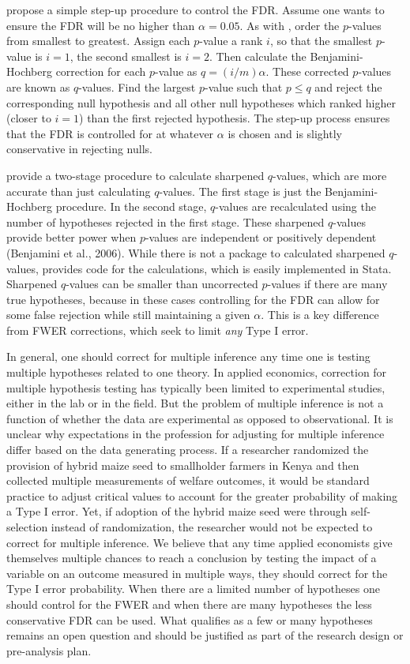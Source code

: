 \documentclass[11pt]{article}
\begin{document}
\cite{benjamini_controlling_1995} propose a simple step-up procedure to control the FDR. Assume one wants to ensure the FDR will be no higher than $\alpha = 0.05$. As with \cite{holm_simple_1979}, order the $p$-values from smallest to greatest. Assign each $p$-value a rank $i$, so that the smallest $p$-value is $i = 1$, the second smallest is $i = 2$. Then calculate the Benjamini-Hochberg correction for each $p$-value as $q = (i \slash m) \alpha$. These corrected $p$-values are known as $q$-values. Find the largest $p$-value such that $p \leq q$ and reject the corresponding null hypothesis and all other null hypotheses which ranked higher (closer to $i = 1$) than the first rejected hypothesis. The step-up process ensures that the FDR is controlled for at whatever $\alpha$ is chosen and is slightly conservative in rejecting nulls.

\cite{benjamini_adaptive_2006} provide a two-stage procedure to calculate sharpened $q$-values, which are more accurate than just calculating $q$-values. The first stage is just the Benjamini-Hochberg procedure. In the second stage, $q$-values are recalculated using the number of hypotheses rejected in the first stage. These sharpened $q$-values provide better power when $p$-values are independent or positively dependent (Benjamini et al., 2006). While there is not a package to calculated sharpened $q$-values, \cite{anderson_multiple_2008} provides code for the calculations, which is easily implemented in Stata. Sharpened $q$-values can be smaller than uncorrected $p$-values if there are many true hypotheses, because in these cases controlling for the FDR can allow for some false rejection while still maintaining a given $\alpha$. This is a key difference from FWER corrections, which seek to limit \emph{any} Type I error.

In general, one should correct for multiple inference any time one is testing multiple hypotheses related to one theory. In applied economics, correction for multiple hypothesis testing has typically been limited to experimental studies, either in the lab or in the field. But the problem of multiple inference is not a function of whether the data are experimental as opposed to observational. It is unclear why expectations in the profession for adjusting for multiple inference differ based on the data generating process. If a researcher randomized the provision of hybrid maize seed to smallholder farmers in Kenya and then collected multiple measurements of welfare outcomes, it would be standard practice to adjust critical values to account for the greater probability of making a Type I error. Yet, if adoption of the hybrid maize seed were through self-selection instead of randomization, the researcher would not be expected to correct for multiple inference. We believe that any time applied economists give themselves multiple chances to reach a conclusion by testing the impact of a variable on an outcome measured in multiple ways, they should correct for the Type I error probability. When there are a limited number of hypotheses one should control for the FWER and when there are many hypotheses the less conservative FDR can be used. What qualifies as a few or many hypotheses remains an open question and should be justified as part of the research design or pre-analysis plan.
\end{document}
